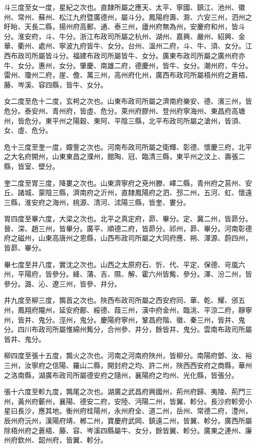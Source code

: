 \begin{pinyinscope}
斗三度至女一度，星紀之次也。直隸所屬之應天、太平、寧國、鎮江、池州、徽州、常州、蘇州、松江九府暨廣德州，屬斗分。鳳陽府壽、滁、六安三州，泗州之盱眙、天長二縣，揚州府高郵、通、泰三州，廬州府無為州，安慶府和州，皆斗分。淮安府，斗、牛分。浙江布政司所屬之杭州、湖州、嘉興、嚴州、紹興、金華、衢州、處州、寧波九府皆牛、女分。台州、溫州二府，斗、牛、須、女分。江西布政司所屬皆斗分。福建布政司所屬皆牛、女分。廣東布政司所屬之廣州府亦牛、女分。惠州，女分。肇慶、南雄二府，德慶州，皆牛、女分。潮州府，牛分。雷州、瓊州二府，崖、儋、萬三州，高州府化州，廣西布政司所屬梧州府之蒼梧、藤、岑溪、容四縣，皆牛、女分。

女二度至危十二度，玄枵之次也。山東布政司所屬之濟南府樂安、德、濱三州，皆危分。泰安州、青州府，皆虛、危分。萊州府膠州、登州府寧海州、東昌府高塘州，皆危分。東平州之陽穀、東阿、平陰三縣，北平布政司所屬之滄州，皆須、女、虛、危分。

危十三度至奎一度，娵訾之次也。河南布政司所屬之衛輝、彰德、懷慶三府，北平之大名府開州，山東東昌之濮州，館陶、冠、臨清三縣，東平州之汶上、壽張二縣，皆室、壁分。

奎二度至胃三度，降婁之次也。山東濟寧府之兗州滕、嶧二縣，青州府之莒州、安丘、諸城、蒙陰三縣，濟南府之沂州，直隸鳳陽府之泗、邳二州，五河、虹、懷遠三縣，淮安府之海州，桃源、清河、沭陽三縣，皆奎、婁分。

胃四度至畢六度，大梁之次也。北平之真定府，昴、畢分。定、冀二州，皆昴分。晉、深、趙三州，皆畢分。廣平、順德二府，皆昴分。祁州，昴、畢分。河南彰德府之磁州，山東高唐州之恩縣，山西布政司所屬之大同府應、朔、渾源、蔚四州，皆昴、畢分。

畢七度至井八度，實沈之次也。山西之太原府石、忻、代、平定、保德、岢嵐六州，平陽府，皆參分。絳、蒲、吉、隰、解、霍六州皆觜、參分。澤、汾二州，皆參分。潞、沁、遼三州，皆參、井分。

井九度至柳三度，鶉首之次也。陜西布政司所屬之西安府同、華、乾、耀、邠五州，鳳翔府隴州，延安府鄜、綏德、葭三州，漢中府金州，臨洮、平涼二府，靜寧州，皆井、鬼分。涇州，鬼分。慶陽府寧州，鞏昌府階、徽、秦三州，皆井、鬼分。四川布政司所屬惟綿州觜分，合州參、井分，餘皆井、鬼分。雲南布政司所屬皆井、鬼分。

柳四度至張十五度，鶉火之次也。河南之河南府陜州，皆柳分。南陽府鄧、汝、裕三州，汝寧府之信陽、羅山二縣，開封府之均、許二州，陜西西安府之商縣，華州之洛南縣，湖廣布政司所屬德安府之隨州，襄陽府之均州、光化縣，皆張分。

張十六度至軫九度，鶉尾之次也。湖廣之武昌府興國州，荊州府歸、夷陵、荊門三州，黃州府蘄州，襄陽、德安二府，安陸、沔陽二州，皆翼、軫分。長沙府軫旁小星曰長沙，應其地。衡州府桂陽州，永州府全、道二州，岳州、常德二府，澧州，辰州府沅州，漢陽府靖、郴二州，寶慶府武岡、鎮遠二州，皆翼、軫分。廣西所屬除梧州府之蒼梧、藤、容、岑溪四縣屬牛、女分，餘皆翼、軫分。廣東之連州、廉州府欽州、韶州府，皆翼、軫分。


\end{pinyinscope}
